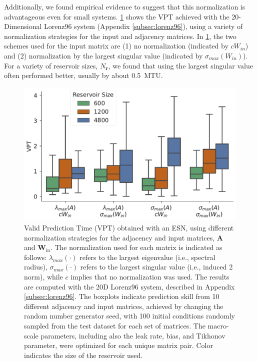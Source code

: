 \documentclass[draft]{agujournal2019}
\newcommand{\hidden}{\mathbf{r}}
\newcommand{\adjacency}{\mathbf{A}}
\newcommand{\inputmatrix}{\mathbf{W}_\text{in}}
\newcommand{\nhidden}{N_{\hidden}}
\begin{document}
Additionally, we found empirical evidence to suggest that this normalization is
advantageous even for small systems.
\cref{fig:simple-normalization} shows the VPT achieved with
the 20-Dimensional Lorenz96 system (Appendix \cref{subsec:lorenz96}), using a variety of
normalization strategies for the input and adjacency matrices.
In \cref{fig:simple-normalization}, the two schemes used for the input matrix
are (1) no normalization (indicated by $c W_{in}$) and
(2) normalization by the largest singular value (indicated by
$\sigma_{max}(W_{in})$).
For a variety of reservoir sizes, $\nhidden$, we found that using the largest
singular value often performed better, usually by about 0.5~MTU.

\begin{figure}
    \centering
    \includegraphics[width=.8\textwidth]{matrix_normalization.pdf}
    \caption{Valid Prediction Time (VPT) obtained with an ESN, using
        different normalization strategies for the adjacency and input matrices,
        $\adjacency$ and $\inputmatrix$. The normalization used for each matrix
        is indicated as follows:
        $\lambda_{max}(\cdot)$ refers to the largest eigenvalue (i.e.,
        spectral radius),
        $\sigma_{max}(\cdot)$ refers to the largest singular value (i.e.,
        induced 2 norm),
        while $c$ implies that no normalization was used.
        The results are computed with the 20D Lorenz96 system, described in
        Appendix \cref{subsec:lorenz96}.
        The boxplots indicate prediction skill from 10 different adjacency and
        input matrices, achieved by changing the random number generator seed,
        with 100 initial conditions randomly sampled from the test dataset for
        each set of matrices.
        The macro-scale parameters, including also the leak rate, bias, and
        Tikhonov parameter, were optimized for each unique matrix pair.
        Color indicates the size of the reservoir used.
    }
    \label{fig:simple-normalization}
\end{figure}
\end{document}

